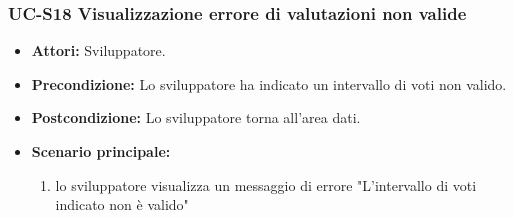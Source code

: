 	\subsubsection{UC-S18 Visualizzazione errore di valutazioni non valide}
		\begin{itemize}					
			\item \textbf{Attori:} Sviluppatore.
			\item \textbf{Precondizione:} Lo sviluppatore ha indicato un intervallo di voti non valido.
			\item \textbf{Postcondizione:} Lo sviluppatore torna all'area dati.
			\item \textbf{Scenario principale:}
				\begin{enumerate}
					\item lo sviluppatore visualizza un messaggio di errore "L'intervallo di voti indicato non è valido"
				\end{enumerate}
		\end{itemize}